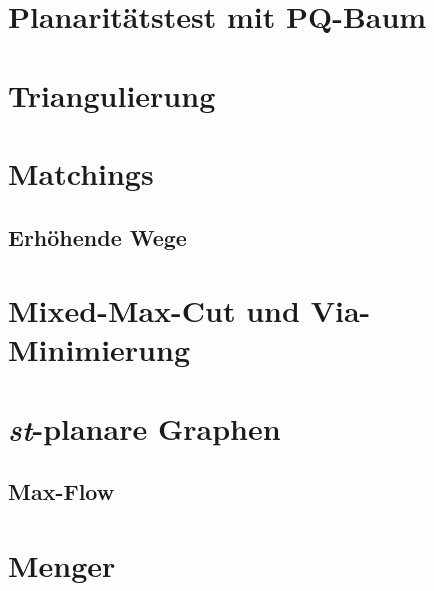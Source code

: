 \documentclass[10pt,a4paper]{article}
\begin{document}

\section{Planaritätstest mit PQ-Baum}


\section{Triangulierung}


\section{Matchings}
\subsection{Erhöhende Wege}


\section{Mixed-Max-Cut und Via-Minimierung}


\section{\textit{st}-planare Graphen}
\subsection{Max-Flow}


\section{Menger}
\end{document}
